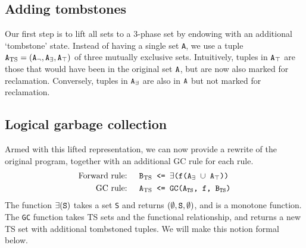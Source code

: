 \documentclass[10pt]{proc}
\renewcommand{\tt}[1]{\ifmmode\text{\texttt{#1}}\else\texttt{#1}\fi}
\begin{document}
\subsection{Adding tombstones}
Our first step is to lift all sets to a 3-phase set by endowing with an additional `tombstone' state.
Instead of having a single set \tt{A}, we use a tuple $\tt{A}_\text{TS} = (\tt{A}_\neg, \tt{A}_\exists, \tt{A}_\top)$ of three mutually exclusive sets.
Intuitively, tuples in $\tt{A}_\top$ are those that would have been in the original set $\tt{A}$, but are now also marked for reclamation.
Conversely, tuples in $\tt{A}_\exists$ are also in $\tt{A}$ but not marked for reclamation.


\subsection{Logical garbage collection}
Armed with this lifted representation, we can now provide a rewrite of the original program, together with an additional GC rule for each rule.
\begin{align}
\text{Forward rule: } && \tt{B}_\text{TS} &\tt{ <= $\exists$(f(A$_\exists$ $\cup$ A$_\top$))}\label{eq:forwardrule}\\
\text{GC rule: } && \tt{A}_\text{TS} &\tt{ <= GC(A$_\text{TS}$, f, B$_\text{TS}$)}\label{eq:gcrule}
\end{align}
The function $\exists(\tt{S})$ takes a set \tt{S} and returns $(\emptyset, \tt{S}, \emptyset)$, and is a monotone function.
The \tt{GC} function takes TS sets and the functional relationship, and returns a new TS set with additional tombstoned tuples.
We will make this notion formal below.
\end{document}
